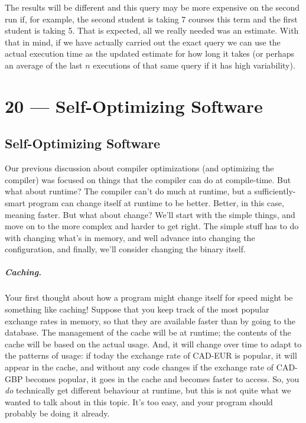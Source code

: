 \documentclass[a4paper]{report}
\begin{document}
The results will be different and this query may be more expensive on the second run if, for example, the second student is taking 7 courses this term and the first student is taking 5. That is expected, all we really needed was an estimate. With that in mind, if we have actually carried out the exact query we can use the actual execution time as the updated estimate for how long it takes (or perhaps an average of the last $n$ executions of that same query if it has high variability). 









\chapter*{20 --- Self-Optimizing Software}


\section*{Self-Optimizing Software}
Our previous discussion about compiler optimizations (and optimizing the compiler) was focused on things that the compiler can do at compile-time. But what about runtime? The compiler can't do much at runtime, but a sufficiently-smart program can change itself at runtime to be better. Better, in this case, meaning faster. But what about change? We'll start with the simple things, and move on to the more complex  and harder to get right. The simple stuff has to do with changing what's in memory, and well advance into changing the configuration, and finally, we'll consider changing the binary itself.

\paragraph{Caching.} Your first thought about how a program might change itself for speed might be something like caching! Suppose that you keep track of the most popular exchange rates in memory, so that they are available faster than by going to the database. The management of the cache will be at runtime; the contents of the cache will be based on the actual usage. And, it will change over time to adapt to the patterns of usage: if today the exchange rate of CAD-EUR is popular, it will appear in the cache, and without any code changes if the exchange rate of CAD-GBP becomes popular, it goes in the cache and becomes faster to access. So, you \textit{do} technically get different behaviour at runtime, but this is not quite what we wanted to talk about in this topic. It's too easy, and your program should probably be doing it already.
\end{document}
